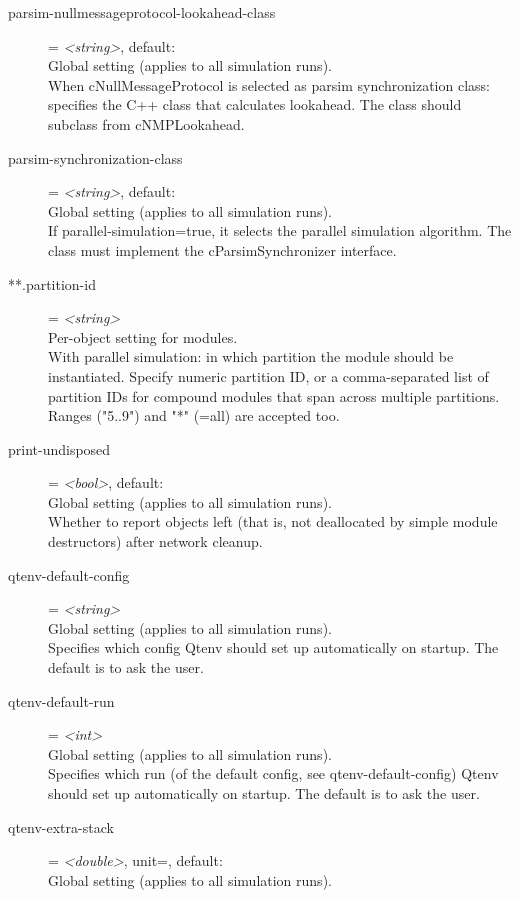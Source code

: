 \begin{description}
\item[parsim-nullmessageprotocol-lookahead-class] = \textit{<string>}, default: \\
    Global setting (applies to all simulation runs).\\
    When cNullMessageProtocol is selected as parsim synchronization class:
    specifies the C++ class that calculates lookahead. The class should
    subclass from cNMPLookahead.
\item[parsim-synchronization-class] = \textit{<string>}, default: \\
    Global setting (applies to all simulation runs).\\
    If parallel-simulation=true, it selects the parallel simulation algorithm.
    The class must implement the cParsimSynchronizer interface.
\item[**.partition-id] = \textit{<string>}\\
    Per-object setting for modules.\\
    With parallel simulation: in which partition the module should be
    instantiated. Specify numeric partition ID, or a comma-separated list of
    partition IDs for compound modules that span across multiple partitions.
    Ranges ("5..9") and "*" (=all) are accepted too.
\item[print-undisposed] = \textit{<bool>}, default: \\
    Global setting (applies to all simulation runs).\\
    Whether to report objects left (that is, not deallocated by simple module
    destructors) after network cleanup.
\item[qtenv-default-config] = \textit{<string>}\\
    Global setting (applies to all simulation runs).\\
    Specifies which config Qtenv should set up automatically on startup. The
    default is to ask the user.
\item[qtenv-default-run] = \textit{<int>}\\
    Global setting (applies to all simulation runs).\\
    Specifies which run (of the default config, see qtenv-default-config) Qtenv
    should set up automatically on startup. The default is to ask the user.
\item[qtenv-extra-stack] = \textit{<double>}, unit=, default: \\
    Global setting (applies to all simulation runs).\\

\end{description}
